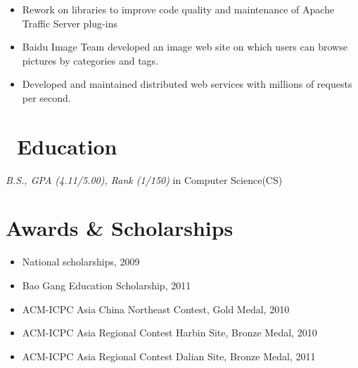 \documentclass{resume}
\begin{document}
 {}{}
\begin{itemize}
    \item Rework on libraries to improve code quality and maintenance of Apache Traffic Server plug-ins
\end{itemize}

 {}{}
\begin{itemize}
    \item Baidu Image Team developed an image web site on which users can browse pictures by categories and tags.
\end{itemize}

 {}{}
\begin{itemize}
    \item  Developed and maintained distributed web services with millions of requests per second.
\end{itemize}

\section{\faGraduationCap\ Education}
\textit{B.S.,  GPA (4.11/5.00), Rank (1/150)} in Computer Science(CS)

\section{Awards \& Scholarships}
\begin{itemize}
    \item National scholarships, 2009
    \item Bao Gang Education Scholarship, 2011
    \item ACM-ICPC Asia China Northeast Contest, Gold Medal, 2010
    \item ACM-ICPC Asia Regional Contest Harbin Site, Bronze Medal, 2010
    \item ACM-ICPC Asia Regional Contest Dalian Site, Bronze Medal, 2011
\end{itemize}
\end{document}
